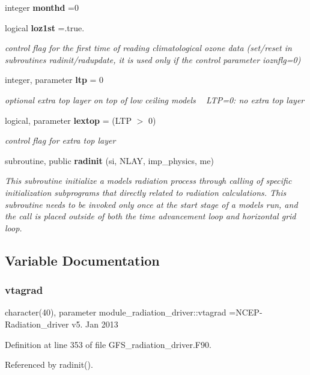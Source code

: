 \begin{DoxyCompactItemize}
integer \textbf{ monthd} =0
\item 
logical \textbf{ loz1st} =.true.
\begin{DoxyCompactList}\small\item\em control flag for the first time of reading climatological ozone data (set/reset in subroutines radinit/radupdate, it is used only if the control parameter ioznflg=0) \end{DoxyCompactList}\item 
integer, parameter \textbf{ ltp} = 0
\begin{DoxyCompactList}\small\item\em optional extra top layer on top of low ceiling models ~\newline
 L\+TP=0\+: no extra top layer \end{DoxyCompactList}\item 
logical, parameter \textbf{ lextop} = (L\+TP $>$ 0)
\begin{DoxyCompactList}\small\item\em control flag for extra top layer \end{DoxyCompactList}\item 
subroutine, public \textbf{ radinit} (si, N\+L\+AY, imp\+\_\+physics, me)
\begin{DoxyCompactList}\small\item\em This subroutine initialize a model\textquotesingle{}s radiation process through calling of specific initialization subprograms that directly related to radiation calculations. This subroutine needs to be invoked only once at the start stage of a model\textquotesingle{}s run, and the call is placed outside of both the time advancement loop and horizontal grid loop. \end{DoxyCompactList}\end{DoxyCompactItemize}


\subsection{Variable Documentation}
\mbox{\label{namespacemodule__radiation__driver_a70a36595385cf1f5794f9c5859e52ab6}} 
\subsubsection{vtagrad}
{\footnotesize\ttfamily character(40), parameter module\+\_\+radiation\+\_\+driver\+::vtagrad =\textquotesingle{}N\+C\+EP-\/Radiation\+\_\+driver v5. Jan 2013 \textquotesingle{}\hspace{0.3cm}{\ttfamily [private]}}



Definition at line 353 of file G\+F\+S\+\_\+radiation\+\_\+driver.\+F90.



Referenced by radinit().

